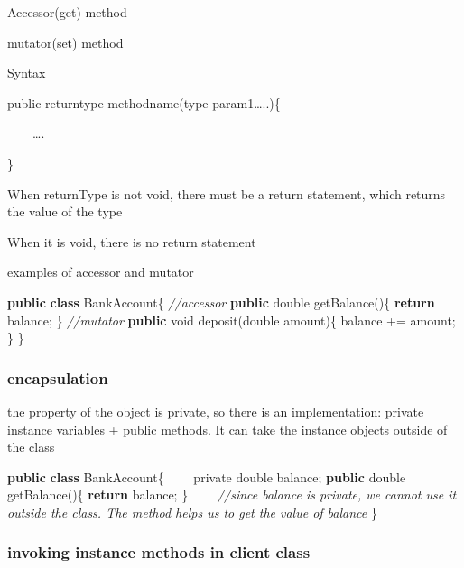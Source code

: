 \documentclass[
  paper=a4,
  ,captions=tableheading
]{scrartcl}
\newenvironment{Shaded}{}{}
\newcommand{\CommentTok}[1]{\textcolor[rgb]{0.38,0.63,0.69}{\textit{#1}}}
\newcommand{\DataTypeTok}[1]{\textcolor[rgb]{0.56,0.13,0.00}{#1}}
\newcommand{\FunctionTok}[1]{\textcolor[rgb]{0.02,0.16,0.49}{#1}}
\newcommand{\KeywordTok}[1]{\textcolor[rgb]{0.00,0.44,0.13}{\textbf{#1}}}
\newcommand{\NormalTok}[1]{#1}
\begin{document}
Accessor(get) method

mutator(set) method

Syntax

public returntype methodname(type param1\ldots{}..)\{

~~~~\ldots{}.

\}

When returnType is not void, there must be a return statement, which
returns the value of the type

When it is void, there is no return statement

examples of accessor and mutator

\begin{Shaded}
\begin{Highlighting}[]
\KeywordTok{public} \KeywordTok{class}\NormalTok{ BankAccount\{}
    \CommentTok{//accessor}
    \KeywordTok{public} \DataTypeTok{double} \FunctionTok{getBalance}\NormalTok{()\{}
    \KeywordTok{return}\NormalTok{ balance;}
\NormalTok{    \}}
    \CommentTok{//mutator}
    \KeywordTok{public} \DataTypeTok{void} \FunctionTok{deposit}\NormalTok{(}\DataTypeTok{double}\NormalTok{ amount)\{}
\NormalTok{        balance += amount;}
\NormalTok{    \}}
\NormalTok{\}}
\end{Highlighting}
\end{Shaded}

\hypertarget{encapsulation}{%
\subsubsection{encapsulation}\label{encapsulation}}

the property of the object is private, so there is an implementation:
private instance variables + public methods. It can take the instance
objects outside of the class

\begin{Shaded}
\begin{Highlighting}[]
\KeywordTok{public} \KeywordTok{class}\NormalTok{ BankAccount\{}
\NormalTok{    private }\DataTypeTok{double}\NormalTok{ balance;}
    \KeywordTok{public} \DataTypeTok{double} \FunctionTok{getBalance}\NormalTok{()\{}
    \KeywordTok{return}\NormalTok{ balance;}
\NormalTok{    \}}
    \CommentTok{//since balance is private, we cannot use it outside the class. The method helps us to get the value of balance}
\NormalTok{\}}
\end{Highlighting}
\end{Shaded}

\hypertarget{invoking-instance-methods-in-client-class}{%
\subsubsection{invoking instance methods in client
class}\label{invoking-instance-methods-in-client-class}}
\end{document}
